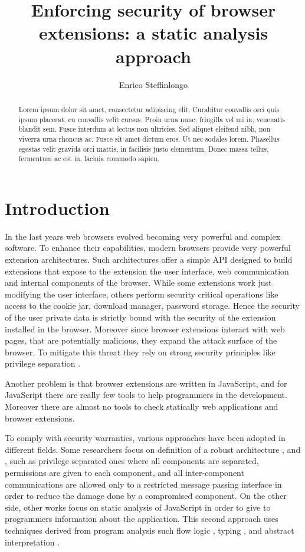 \documentclass[10pt]{llncs}
\author{Enrico Steffinlongo}
\title{Enforcing security of browser extensions: a static analysis approach}
\begin{document}
\maketitle

\begin{abstract}
Lorem ipsum dolor sit amet, consectetur adipiscing elit. Curabitur convallis orci quis ipsum placerat, eu convallis velit cursus. Proin urna nunc, fringilla vel mi in, venenatis blandit sem. Fusce interdum at lectus non ultricies. Sed aliquet eleifend nibh, non viverra urna rhoncus ac. Fusce sit amet dictum eros. Ut nec sodales lorem. Phasellus egestas velit gravida orci mattis, in facilisis justo elementum. Donec massa tellus, fermentum ac est in, lacinia commodo sapien.
\end{abstract}

\section{Introduction}
In the last years web browsers evolved becoming very powerful and complex software. To enhance their capabilities, modern browsers provide very powerful extension architectures. Such architectures offer a simple API designed to build extensions that expose to the extension the user interface, web communication and internal components of the browser. While some extensions work just modifying the user interface, others perform security critical operations like access to the cookie jar, download manager, password storage. Hence the security of the user private data is strictly bound with the security of the extension installed in the browser. Moreover since browser extensions interact with web pages, that are potentially malicious, they expand the attack surface of the browser. To mitigate this threat they rely on strong security principles like privilege separation \cite{ChromeExtSpec}.

Another problem is that browser extensions are written in JavaScript, and for JavaScript there are really few tools to help programmers in the development. Moreover there are almost no tools to check statically web applications and browser extensions.

To comply with security warranties, various approaches have been adopted in different fields. Some researchers focus on definition of a robust architecture \cite{ChromeExtSpec}, \cite{ChromeExtSpecSnd} and \cite{PriviSep}, such as privilege separated ones where all components are separated, permissions are given to each component, and all inter-component communications are allowed only to a restricted message passing interface in order to reduce the damage done by a compromised component. On the other side, other works focus on static analysis of JavaScript in order to give to programmers information about the application. This second approach uses techniques derived from program analysis \cite{PrincipleProgramAnalysis} such flow logic \cite{FlowLogic}, typing \cite{TAJS} \cite{strobe}, and abstract interpretation \cite{LambdaJSMightVanHorn}.
\end{document}
